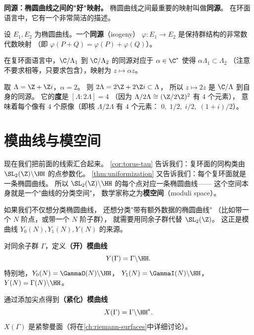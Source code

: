 \textbf{同源：椭圆曲线之间的"好"映射。}
椭圆曲线之间最重要的映射叫做\textbf{同源}。
在环面语言中，它有一个非常简洁的描述。

\begin{definition}[同源]
\label{def:isogeny}
设 $E_1, E_2$ 为椭圆曲线。一个\textbf{同源}（isogeny）
$\varphi\colon E_1 \to E_2$ 是保持群结构的非常数代数映射
（即 $\varphi(P + Q) = \varphi(P) + \varphi(Q)$）。

在复环面语言中，$\C/\Lambda_1$ 到 $\C/\Lambda_2$ 的同源对应于
$\alpha \in \C^*$ 使得 $\alpha\Lambda_1 \subset \Lambda_2$
（注意不要求相等，只要求包含），映射为 $z \mapsto \alpha z$。
\end{definition}

\begin{example}[乘法同源]
\label{ex:multiplication-isogeny}
取 $\Lambda = \Z + \Z i$，$\alpha = 2$。
则 $2\Lambda = 2\Z + 2\Z i \subset \Lambda$，
所以 $z \mapsto 2z$ 是 $\C/\Lambda$ 到自身的同源。
它的\textbf{度}是 $[\Lambda : 2\Lambda] = 4$
（因为 $\Lambda/2\Lambda \cong (\Z/2\Z)^2$ 有 $4$ 个元素），
意味着每个像有 $4$ 个原像（即核 $\Lambda/2\Lambda$ 有 $4$ 个元素：
$0, \; 1/2, \; i/2, \; (1+i)/2$）。
\end{example}


\section{模曲线与模空间}
\label{sec:modular-curves-moduli}

现在我们把前面的线索汇合起来。
\cref{cor:torus-tau} 告诉我们：复环面的同构类由
$\SL_2(\Z) \backslash \HH$ 的点参数化。
\cref{thm:uniformization} 又告诉我们：每个复环面就是一条椭圆曲线。
所以 $\SL_2(\Z) \backslash \HH$ 的每个点对应一条椭圆曲线——
这个空间本身就是一个"曲线的分类空间"，
数学家称之为\textbf{模空间}（moduli space）。

如果我们不仅想分类椭圆曲线，
还想分类"带有额外数据的椭圆曲线"
（比如带一个 $N$ 阶点，或带一个 $N$ 阶子群），
就需要用同余子群代替 $\SL_2(\Z)$。
这正是模曲线 $Y_0(N), Y_1(N), Y(N)$ 的来源。

\begin{definition}[模曲线]
\label{def:modular-curves}
对同余子群 $\Gamma$，定义\textbf{（开）模曲线}
\[
  Y(\Gamma) = \Gamma \backslash \HH.
\]
特别地，$Y_0(N) = \GammaO(N) \backslash \HH$，
$Y_1(N) = \GammaI(N) \backslash \HH$，
$Y(N) = \Gamma(N) \backslash \HH$。

通过添加尖点得到\textbf{（紧化）模曲线}
\[
  X(\Gamma) = \Gamma \backslash \HH^*.
\]
$X(\Gamma)$ 是紧黎曼面（将在\cref{ch:riemann-surfaces}中详细讨论）。
\end{definition}

